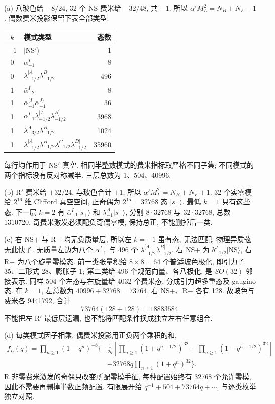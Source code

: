 \begin{solution}
(a) 八玻色给 $-8/24$, 32 个 NS 费米给 $-32/48$, 共 $-1$. 所以
$\alpha'M_L^2=N_B+N_F-1$. 偶数费米投影保留下表全部类型:
\begin{center}
\begin{tabular}{c l r}\toprule
$k$ & 模式类型 & 态数\\\midrule
$-1$ & $|\mathrm{NS}'\rangle$ &1\\
0 & $\bar\alpha_{-1}^I$ &8\\
0 & $\lambda_{-1/2}^{[A}\lambda_{-1/2}^{B]}$ &496\\
1 & $\bar\alpha_{-2}^I$ &8\\
1 & $\bar\alpha_{-1}^{(I}\bar\alpha_{-1}^{J)}$ &36\\
1 & $\bar\alpha_{-1}^I\lambda_{-1/2}^{[A}\lambda_{-1/2}^{B]}$ &3968\\
1 & $\lambda_{-3/2}^A\lambda_{-1/2}^B$ &1024\\
1 & $\lambda_{-1/2}^{[A}\lambda_{-1/2}^B\lambda_{-1/2}^C\lambda_{-1/2}^{D]}$ &35960\\\bottomrule
\end{tabular}
\end{center}
每行均作用于 NS$'$ 真空. 相同半整数模式的费米指标取严格不同子集; 不同模式的两个指标没有反对称减半. 三层总数为 1、504、40996.

(b) R$'$ 费米给 $+32/24$, 与玻色合计 $+1$, 所以
$\alpha'M_L^2=N_B+N_F+1$.
32 个实零模给 $2^{16}$ 维 Clifford 真空空间, 正奇偶为 $2^{15}=32768$ 态 $|s_+\rangle$. 最低 $k=1$ 只有这些态.
下一层 $k=2$ 有 $\bar\alpha_{-1}^I|s_+\rangle$ 和
$\lambda_{-1}^A|s_-\rangle$, 分别 $8\cdot32768$ 与 $32\cdot32768$, 总数 1310720. 奇费米激发必须配负奇偶零模, 保持总正, 不能删掉后一类.

(c) 右 NS$+$ 与 R$-$ 均无负质量层, 所以左 $k=-1$ 虽有态, 无法匹配, 物理异质弦无此快子.
无质量左边为八个 $\bar\alpha_{-1}^I$ 与 496 个 $\lambda_{-1/2}^{[A}\lambda_{-1/2}^{B]}$. 右 NS$+$ 为 $b_{-1/2}^J|\mathrm{NS}\rangle$, 右 R$-$ 为八个旋量零模态. 前一类张量积给 $8\times8=64$ 个普适玻色极化, 即引力子 35、二形式 28、膨胀子 1; 第二类给 496 个规范向量、各八极化, 是 $SO(32)$ 邻接表示. 同样 504 个左态与右旋量给 4032 个费米态, 分成引力超多重态及 gaugino 态.
在 $k=1$, 左总数为 $40996+32768=73764$, 右 NS$+$、R$-$ 各有 128. 故玻色与费米各 9441792, 合计
\[
 73764(128+128)=18883584.
\]
不能把左 R$'$ 最低层遗漏, 也不能将匹配条件换成独立左右任意组合.

(d) 每类模式因子相乘, 偶费米投影用正负两个乘积的和,
\begin{align*}
 f_L(q)=\prod_{n\geq1}(1-q^n)^{-8}\Bigg\{
 &\frac1{2q}\left[\prod_{n\geq1}(1+q^{n-1/2})^{32}
 +\prod_{n\geq1}(1-q^{n-1/2})^{32}\right]\\
 &+32768q\prod_{n\geq1}(1+q^n)^{32}\Bigg\}.
\end{align*}
R 非零费米激发的奇偶只改变所配零模手征, 每种配置始终有 32768 个允许零模, 因此不需要再删掉半数正频配置. 有限展开给 $q^{-1}+504+73764q+\cdots$, 与逐类枚举独立对照.
\end{solution}

